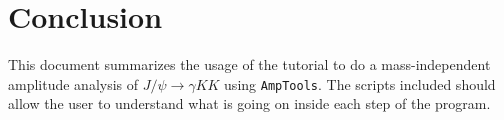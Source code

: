\documentclass[11pt]{article}
\newcommand{\AmpTools}{{\tt{AmpTools}}}
\begin{document}
\section{Conclusion}

This document summarizes the usage of the tutorial to do a
mass-independent amplitude analysis of $J/\psi \to \gamma KK$ using
\AmpTools. The scripts included should allow the user to understand
what is going on inside each step of the program.

% 

 
\end{document}
